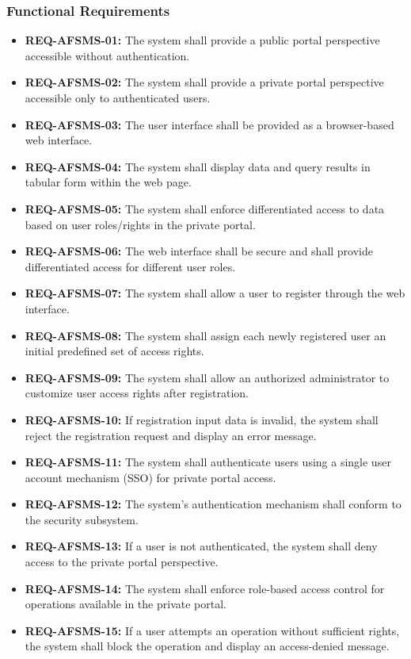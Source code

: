\documentclass[11pt, a4paper]{article}
\begin{document}
\subsubsection{Functional Requirements}
\begin{itemize}
    \item \textbf{REQ-AFSMS-01:} The system shall provide a public portal perspective accessible without authentication.
    \item \textbf{REQ-AFSMS-02:} The system shall provide a private portal perspective accessible only to authenticated users.
    \item \textbf{REQ-AFSMS-03:} The user interface shall be provided as a browser-based web interface.
    \item \textbf{REQ-AFSMS-04:} The system shall display data and query results in tabular form within the web page.
    \item \textbf{REQ-AFSMS-05:} The system shall enforce differentiated access to data based on user roles/rights in the private portal.
    \item \textbf{REQ-AFSMS-06:} The web interface shall be secure and shall provide differentiated access for different user roles.
    \item \textbf{REQ-AFSMS-07:} The system shall allow a user to register through the web interface.
    \item \textbf{REQ-AFSMS-08:} The system shall assign each newly registered user an initial predefined set of access rights.
    \item \textbf{REQ-AFSMS-09:} The system shall allow an authorized administrator to customize user access rights after registration.
    \item \textbf{REQ-AFSMS-10:} If registration input data is invalid, the system shall reject the registration request and display an error message.
    \item \textbf{REQ-AFSMS-11:} The system shall authenticate users using a single user account mechanism (SSO) for private portal access.
    \item \textbf{REQ-AFSMS-12:} The system's authentication mechanism shall conform to the security subsystem.
    \item \textbf{REQ-AFSMS-13:} If a user is not authenticated, the system shall deny access to the private portal perspective.
    \item \textbf{REQ-AFSMS-14:} The system shall enforce role-based access control for operations available in the private portal.
    \item \textbf{REQ-AFSMS-15:} If a user attempts an operation without sufficient rights, the system shall block the operation and display an access-denied message.
\end{itemize}
\end{document}
